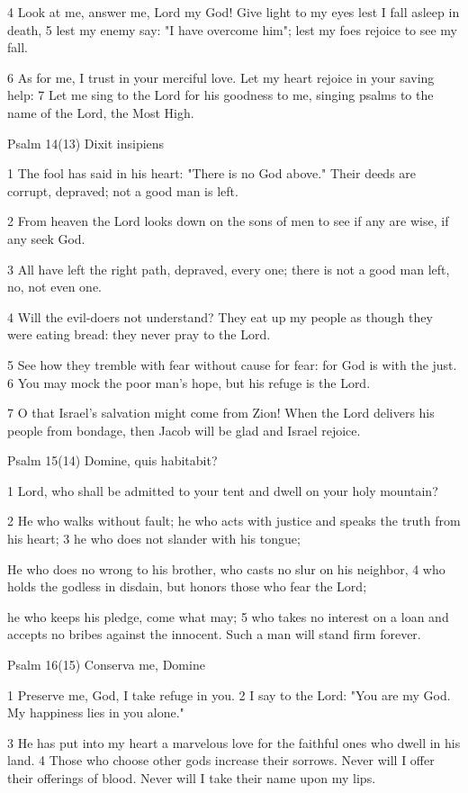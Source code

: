 4 Look at me, answer me, Lord my God!
Give light to my eyes lest I fall asleep in death,
5 lest my enemy say: "I have overcome him";
lest my foes rejoice to see my fall.

6 As for me, I trust in your merciful love.
Let my heart rejoice in your saving help:
7 Let me sing to the Lord for his goodness to me,
singing psalms to the name of the Lord, the Most High.



Psalm 14(13) Dixit insipiens

1 The fool has said in his heart:
"There is no God above."
Their deeds are corrupt, depraved;
not a good man is left.

2 From heaven the Lord looks down
on the sons of men
to see if any are wise,
if any seek God.

3 All have left the right path,
depraved, every one;
there is not a good man left,
no, not even one.

4 Will the evil-doers not understand?
They eat up my people
as though they were eating bread:
they never pray to the Lord.

5 See how they tremble with fear
without cause for fear:
for God is with the just.
6 You may mock the poor man's hope,
but his refuge is the Lord.

7 O that Israel's salvation might come from Zion!
When the Lord delivers his people from bondage,
then Jacob will be glad and Israel rejoice.


Psalm 15(14) Domine, quis habitabit?

1 Lord, who shall be admitted to your tent
and dwell on your holy mountain?

2 He who walks without fault;
he who acts with justice
and speaks the truth from his heart;
3 he who does not slander with his tongue;

He who does no wrong to his brother,
who casts no slur on his neighbor,
4 who holds the godless in disdain,
but honors those who fear the Lord;

he who keeps his pledge, come what may;
5 who takes no interest on a loan
and accepts no bribes against the innocent.
Such a man will stand firm forever.


Psalm 16(15) Conserva me, Domine

1 Preserve me, God, I take refuge in you.
2 I say to the Lord: "You are my God.
My happiness lies in you alone."

3 He has put into my heart a marvelous love
for the faithful ones who dwell in his land.
4 Those who choose other gods increase their sorrows.
Never will I offer their offerings of blood.
Never will I take their name upon my lips.

